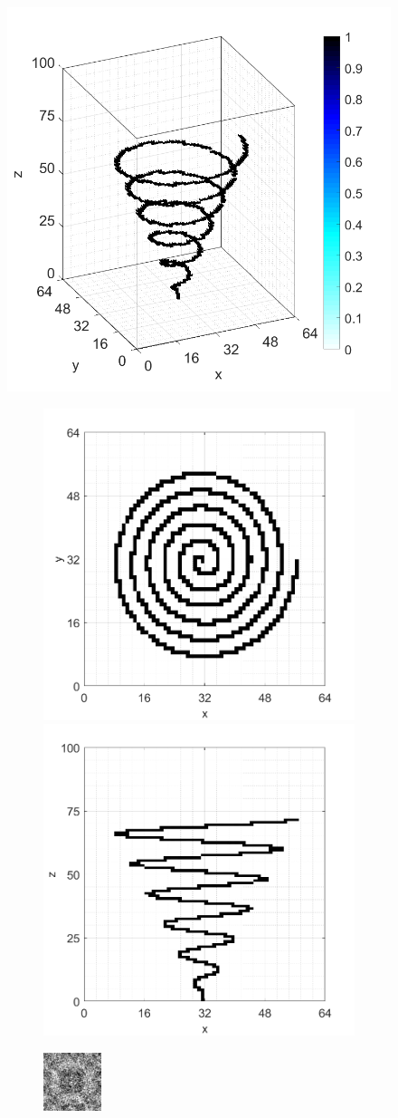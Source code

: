 \documentclass[9pt,twocolumn,twoside]{osajnl}
\begin{document}
\begin{figure}[htbp]
\centering

\begin{minipage}[b]{1\textwidth}
\centering
\includegraphics[width=0.18\columnwidth]{conhelix}
\begin{subfigure}[b]{0.18\textwidth}
  \centering
  \includegraphics[width=0.45\columnwidth]{conhelix_top}

  \includegraphics[width=0.45\columnwidth]{conhelix_side}
\end{subfigure}
\begin{subfigure}[b]{0.18\textwidth}
  \centering
  \includegraphics[width=0.45\columnwidth]{conhelix_complex_holo}


\end{subfigure}
\end{minipage}
\end{figure}
\end{document}
